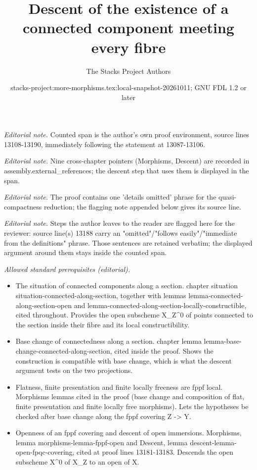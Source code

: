 \documentclass[10pt,a4paper]{amsart}
\title{Descent of the existence of a connected component meeting every fibre}
\author{The Stacks Project Authors}
\date{stacks-project:more-morphisms.tex:local-snapshot-20261011; GNU FDL 1.2 or later}
\theoremstyle{plain}
\theoremstyle{definition}
\theoremstyle{remark}
\numberwithin{equation}{subsection}
\begin{document}
\maketitle
\noindent\textit{Editorial note.} Counted span is the author's own proof environment, source lines 13108-13190, immediately following the statement at 13087-13106.\par\medskip
\noindent\textit{Editorial note.} Nine cross-chapter pointers (Morphisms, Descent) are recorded in assembly.external\_references; the descent step that uses them is displayed in the span.\par\medskip
\noindent\textit{Editorial note.} The proof contains one 'details omitted' phrase for the quasi-compactness reduction; the flagging note appended below gives its source line.\par\medskip
\noindent\textit{Editorial note.} Steps the author leaves to the reader are flagged here for the reviewer: source line(s) 13188 carry an "omitted"/"follows easily"/"immediate from the definitions" phrase. Those sentences are retained verbatim; the displayed argument around them stays inside the counted span.\par\medskip
\noindent\textit{Allowed standard prerequisites (editorial).}\begin{itemize}
\item The situation of connected components along a section. chapter situation situation-connected-along-section, together with lemmas lemma-connected-along-section-open and lemma-connected-along-section-locally-constructible, cited throughout. Provides the open subscheme X\_Z\textasciicircum{}0 of points connected to the section inside their fibre and its local constructibility.
\item Base change of connectedness along a section. chapter lemma lemma-base-change-connected-along-section, cited inside the proof. Shows the construction is compatible with base change, which is what the descent argument tests on the two projections.
\item Flatness, finite presentation and finite locally freeness are fppf local. Morphisms lemmas cited in the proof (base change and composition of flat, finite presentation and finite locally free morphisms). Lets the hypotheses be checked after base change along the fppf covering Z -> Y.
\item Openness of an fppf covering and descent of open immersions. Morphisms, lemma morphisms-lemma-fppf-open and Descent, lemma descent-lemma-open-fpqc-covering, cited at proof lines 13181-13183. Descends the open subscheme X\textasciicircum{}0 of X\_Z to an open of X.
\end{itemize}\medskip
\end{document}
